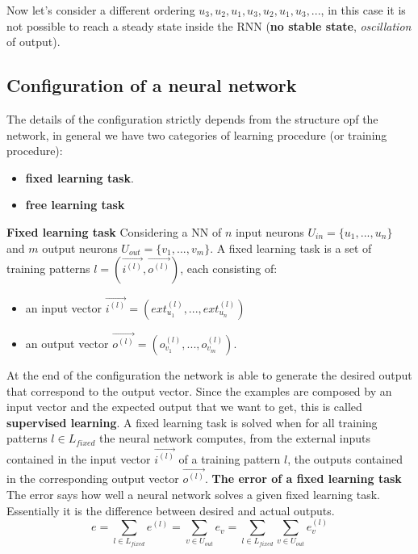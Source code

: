 \documentclass{article}
\begin{document}
Now let's consider a different ordering $u_3,u_2,u_1,u_3,u_2,u_1,u_3,...$, in this case
it is not possible to reach a steady state inside the RNN (\textbf{no stable state}, \textit{
    oscillation} of output).

\subsection{Configuration of a neural network}
The details of the configuration strictly depends from the
structure opf the network, in general we have two categories of
learning procedure (or training procedure):
\begin{itemize}
    \item \textbf{fixed learning task}.
    \item \textbf{free learning task}
\end{itemize}
\pagebreak
\noindent\textbf{Fixed learning task}
\newline
\noindent Considering a NN of $n$ input neurons $U_{in}=\{u_1,...,u_n\}$ and $m$ output neurons
$U_{out}=\{v_1,...,v_m\}$. A fixed learning task is a set of training patterns
$l=(\vec{i^{(l)}}, \vec{o^{(l)}})$, each consisting of:
\begin{itemize}
    \item an input vector $\vec{i^{(l)}} =(ext_{u_1}^{(l)},...,ext_{u_n}^{(l)})$
    \item an output vector $\vec{o^{(l)}} =(o_{v_1}^{(l)},...,o_{v_m}^{(l)})$.
\end{itemize}
\noindent At the end of the configuration the network is able to generate the desired output
that correspond to the output vector. Since the examples are composed by an input
vector and the expected output that we want to get, this is called \textbf{supervised
    learning}.
\newline\newline
A fixed learning task is solved when for all training patterns $l\in L_{fixed}$ the
neural network computes, from the external inputs contained in the input vector
$\vec{i^{(l)}}$ of a training pattern $l$, the outputs contained in the
corresponding output vector $\vec{o^{(l)}}$.
\newline\newline
\noindent\textbf{The error of a fixed learning task}
\newline
The error says how well a neural network solves a given fixed learning task. Essentially
it is the difference between desired and actual outputs.
$$e=\sum_{l\in L_{fixed}}e^{(l)}=\sum_{v\in U_{out}}e_v=\sum_{l\in L_{fixed}} \sum_{v\in U_{out}}e_v^{(l)}$$
\end{document}
